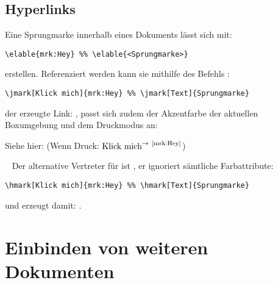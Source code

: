 \clearpage
\newcommand{\printmark}[2][Linkname]{\ensuremath{\text{#1}^{\rightarrow~\text{\pageref{#2}}}}}





\subsection{Hyperlinks}
Eine Sprungmarke innerhalb eines Dokuments lässt sich mit:
\begin{lstlisting}[language=lLatex]
\elable{mrk:Hey} %% \elable{<Sprungmarke>}
\end{lstlisting}
erstellen. Referenziert werden kann sie mithilfe des Befehls \textbf{}:
\begin{lstlisting}[language=lLatex]
\jmark[Klick mich]{mrk:Hey} %% \jmark[Text]{Sprungmarke}
\end{lstlisting}
der erzeugte Link: , passt sich zudem der Akzentfarbe der aktuellen Boxumgebung und dem Druckmodus an:\smallskip
\begin{zusammenfassung}[Testzusammenfassung]
Siehe hier:  (Wenn Druck: \printmark[Klick mich]{mrk:Hey})
\end{zusammenfassung}~\smallskip\newline
{}Der alternative Vertreter für \textbf{} ist \textbf{}, er ignoriert sämtliche Farbattribute:
\begin{lstlisting}[language=lLatex]
\hmark[Klick mich]{mrk:Hey} %% \hmark[Text]{Sprungmarke}
\end{lstlisting}
und erzeugt damit: .





\section{Einbinden von weiteren Dokumenten}
